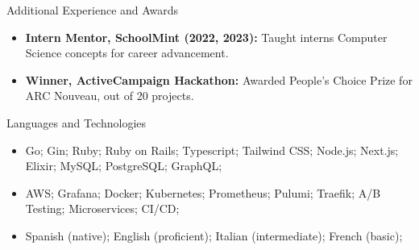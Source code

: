 \documentclass[]{mcdowellcv}
\begin{document}
	\begin{cvsection}{Additional Experience and Awards}
		\begin{cvsubsection}{}{}{}	
			\begin{itemize}
				\item \textbf{Intern Mentor, SchoolMint (2022, 2023):} Taught interns Computer Science concepts for career advancement.
				\item \textbf{Winner, ActiveCampaign Hackathon:} Awarded People's Choice Prize for ARC Nouveau, out of 20 projects.
			\end{itemize}
		\end{cvsubsection}
	\end{cvsection}
	\begin{cvsection}{Languages and Technologies}
		\begin{cvsubsection}{}{}{}	
			\begin{itemize}
				\item Go; Gin; Ruby; Ruby on Rails; Typescript; Tailwind CSS; Node.js; Next.js; Elixir; MySQL; PostgreSQL; GraphQL;
				\item AWS; Grafana; Docker; Kubernetes; Prometheus; Pulumi; Traefik; A/B Testing; Microservices; CI/CD;
				\item Spanish (native); English (proficient); Italian (intermediate); French (basic);
			\end{itemize}
		\end{cvsubsection}
	\end{cvsection}
	
\end{document}

